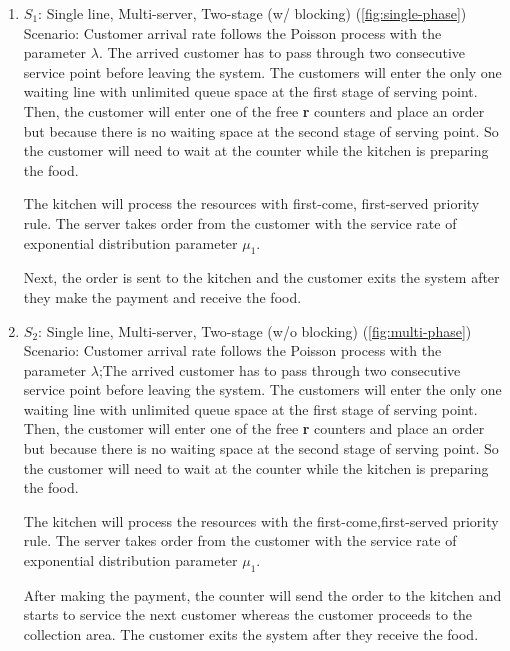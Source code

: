 \begin{enumerate}[label=\roman*)]
    \item $S_1$: Single line, Multi-server, Two-stage (w/ blocking) (\autoref{fig:single-phase}) \\
          Scenario: Customer arrival rate follows the Poisson process with the parameter $\lambda$. The arrived customer has to pass through two consecutive service point before leaving the system. The customers will enter the only one waiting line with unlimited queue space at the first stage of serving point.
          Then, the customer will enter one of the free \textbf{r} counters and place an order but because there is no waiting space at the second stage of serving point. So the customer will need to wait at the counter while the kitchen is preparing the food.

          The kitchen will process the resources with  first-come, first-served priority rule. The server takes order from the customer with the service rate of exponential distribution parameter $\mu_1$.

          Next, the order is sent to the kitchen and the customer exits the system after they make the payment and receive the food.

    \item $S_2$: Single line, Multi-server, Two-stage (w/o blocking) (\autoref{fig:multi-phase}) \\
          Scenario: Customer arrival rate follows the Poisson process with the parameter $\lambda$;The arrived customer has to pass through two consecutive service point before leaving the system. The customers will enter the only one waiting line with unlimited queue space at the first stage of serving point.
          Then, the customer will enter one of the free \textbf{r} counters and place an order but because there is no waiting space at the second stage of serving point. So the customer will need to wait at the counter while the kitchen is preparing the food.

          The kitchen will process the resources with the first-come,first-served priority rule.  The server takes order from the customer with the service rate of exponential distribution parameter $\mu_1$.

          After making the payment, the counter will send the order to the kitchen and starts to service the next customer whereas the customer proceeds to the collection area. The customer exits the system after they receive the food.
\end{enumerate}

